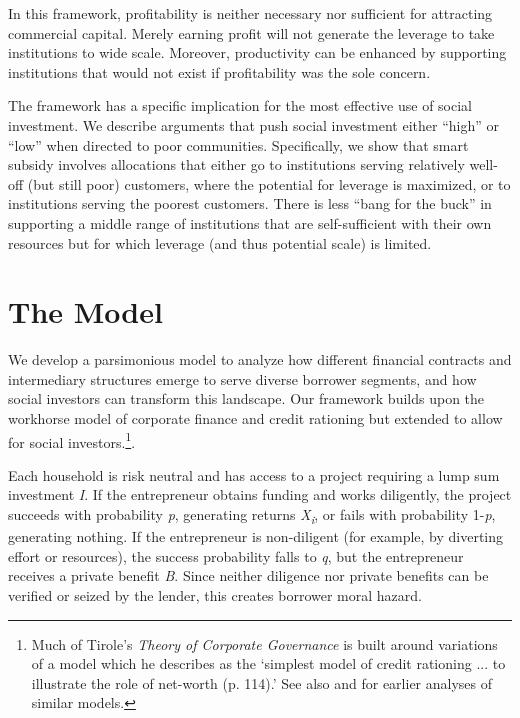 \documentclass[letterpaper, 12pt]{article}
\begin{document}
In this framework, profitability is neither necessary nor sufficient for
attracting commercial capital. Merely earning profit will not generate
the leverage to take institutions to wide scale. Moreover, productivity
can be enhanced by supporting institutions that would not exist if
profitability was the sole concern.

The framework has a specific implication for the most effective use of
social investment. We describe arguments that push social investment
either ``high'' or ``low'' when directed to poor communities.
Specifically, we show that smart subsidy involves allocations that
either go to institutions serving relatively well-off (but still poor)
customers, where the potential for leverage is maximized, or to
institutions serving the poorest customers. There is less ``bang for the
buck'' in supporting a middle range of institutions that are
self-sufficient with their own resources but for which leverage (and
thus potential scale) is limited.

\section{The Model}\label{the-model}


We develop a parsimonious model to analyze how different financial contracts and intermediary structures emerge to serve diverse borrower segments, and how social investors can transform this landscape. Our framework builds upon the \citet{tirole2006} workhorse model of corporate finance and credit rationing but extended to allow for social investors.\footnote{Much of Tirole's \emph{Theory of Corporate Governance} is  built around variations of a model which he describes as the `simplest model of credit rationing ... to illustrate the role of net-worth (p. 114).' See also \citet{holmstrom1997} and  \citet{conning1999} for earlier analyses of similar models.}.

Each household is risk neutral and has access to a project requiring a lump sum investment \emph{I}. If the entrepreneur obtains funding and works diligently, the project succeeds with probability \emph{p}, generating returns \emph{X\textsubscript{i}}, or fails with probability 1-\emph{p}, generating nothing. If the entrepreneur is non-diligent (for example, by diverting effort or resources), the success probability falls to \emph{q}, but the entrepreneur receives a private benefit \emph{B}. Since neither diligence nor private benefits can be verified or seized by the lender, this creates borrower moral hazard.
\end{document}
